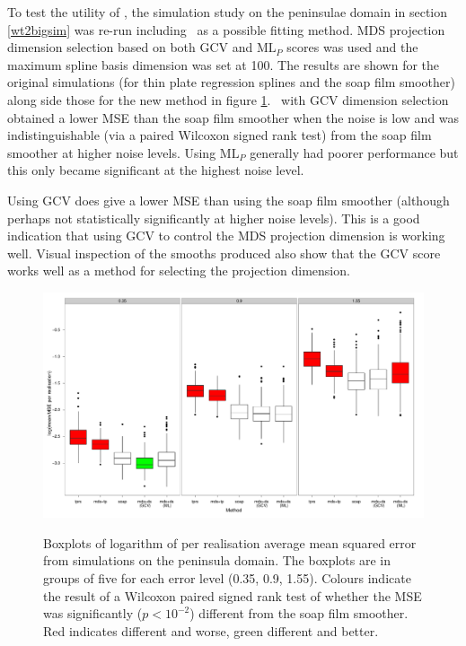 To test the utility of \mdsds, the simulation study on the peninsulae domain in section \ref{wt2bigsim} was re-run including \mdsds\ as a possible fitting method\label{cor-r35-2}. MDS projection dimension selection based on both GCV and $\text{ML}_P$ scores was used and the maximum spline basis dimension was set at 100. The results are shown for the original simulations (for thin plate regression splines and the soap film smoother) along side those for the new method in figure \ref{wt2-boxplot-duchon}. \mdsds\ with GCV dimension selection obtained a lower MSE than the soap film smoother when the noise is low and was indistinguishable (via a paired Wilcoxon signed rank test) from the soap film smoother at higher noise levels. Using $\text{ML}_P$ generally had poorer performance but this only became significant at the highest noise level.

Using GCV does give a lower MSE than using the soap film smoother (although perhaps not statistically significantly at higher noise levels). This is a good indication that using GCV to control the MDS projection dimension is working well. Visual inspection of the smooths produced also show that the GCV score works well as a method for selecting the projection dimension.

\begin{figure}
\centering
\includegraphics[width=\textwidth]{mds/figs/wt2-boxplot-duchon.pdf} \\
\caption{Boxplots of logarithm of per realisation average mean squared error from simulations on the peninsula domain. The boxplots are in groups of five\label{cor-r52} for each error level (0.35, 0.9, 1.55). Colours indicate the result of a Wilcoxon paired signed rank test of whether the MSE was significantly ($p<10^{-2}$) different from the soap film smoother. Red indicates different and worse, green different and better.}
\label{wt2-boxplot-duchon}
\end{figure}


